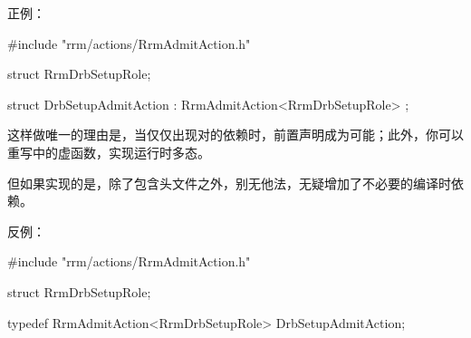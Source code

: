 \begin{content}
正例：
\begin{leftbar}
\begin{c++}
#include "rrm/actions/RrmAdmitAction.h"

struct RrmDrbSetupRole;

struct DrbSetupAdmitAction : RrmAdmitAction<RrmDrbSetupRole> {};
\end{c++}
\end{leftbar}

这样做唯一的理由是，当仅仅出现对的依赖时，前置声明成为可能；此外，你可以重写中的虚函数，实现运行时多态。

但如果实现的是，除了包含头文件之外，别无他法，无疑增加了不必要的编译时依赖。

反例：
\begin{leftbar}
\begin{c++}
#include "rrm/actions/RrmAdmitAction.h"

struct RrmDrbSetupRole;

typedef RrmAdmitAction<RrmDrbSetupRole> DrbSetupAdmitAction;
\end{c++}
\end{leftbar}

\end{content}
